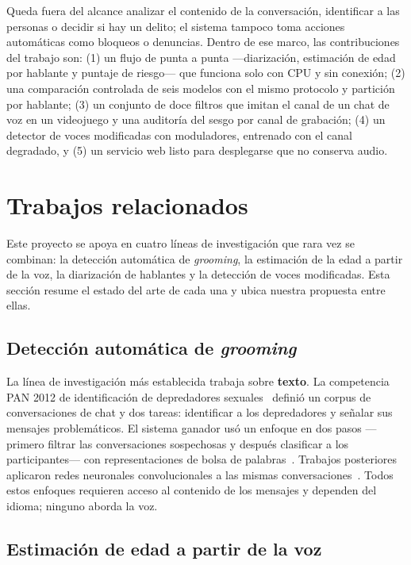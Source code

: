 \documentclass[11pt,a4paper]{article}
\newcommand{\gr}{\emph{grooming}}
\begin{document}
Queda fuera del alcance analizar el contenido de la conversación, identificar a las personas o decidir si hay un delito; el sistema tampoco toma acciones automáticas como bloqueos o denuncias. Dentro de ese marco, las contribuciones del trabajo son: (1) un flujo de punta a punta ---diarización, estimación de edad por hablante y puntaje de riesgo--- que funciona solo con CPU y sin conexión; (2) una comparación controlada de seis modelos con el mismo protocolo y partición por hablante; (3) un conjunto de doce filtros que imitan el canal de un chat de voz en un videojuego y una auditoría del sesgo por canal de grabación; (4) un detector de voces modificadas con moduladores, entrenado con el canal degradado, y (5) un servicio web listo para desplegarse que no conserva audio.

\section{Trabajos relacionados}
\label{sec:trabajos}

Este proyecto se apoya en cuatro líneas de investigación que rara vez se combinan: la detección automática de \gr{}, la estimación de la edad a partir de la voz, la diarización de hablantes y la detección de voces modificadas. Esta sección resume el estado del arte de cada una y ubica nuestra propuesta entre ellas.

\subsection{Detección automática de \emph{grooming}}

La línea de investigación más establecida trabaja sobre \textbf{texto}. La competencia PAN 2012 de identificación de depredadores sexuales~\cite{pan2012} definió un corpus de conversaciones de chat y dos tareas: identificar a los depredadores y señalar sus mensajes problemáticos. El sistema ganador usó un enfoque en dos pasos ---primero filtrar las conversaciones sospechosas y después clasificar a los participantes--- con representaciones de bolsa de palabras~\cite{villatoro2012}. Trabajos posteriores aplicaron redes neuronales convolucionales a las mismas conversaciones~\cite{ebrahimi2016}. Todos estos enfoques requieren acceso al contenido de los mensajes y dependen del idioma; ninguno aborda la voz.

\subsection{Estimación de edad a partir de la voz}
\end{document}
